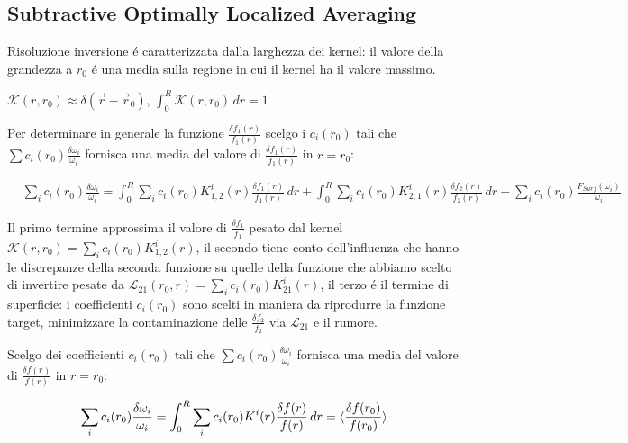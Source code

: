 \documentclass[../main.tex]{subfiles}
\begin{document}
\subsection{Subtractive Optimally Localized Averaging}

\begin{workout}
Risoluzione inversione \'e caratterizzata dalla larghezza dei kernel: il valore della grandezza a $r_0$ \'e una media sulla regione in cui il kernel ha il valore massimo.
\end{workout}

\begin{workout}[OLA]
$\mathcal{K}(r,r_0)\approx\delta(\vec{r}-\vec{r}_0)$, $\int_0^R\mathcal{K}(r,r_0)\,dr=1$
\end{workout}

\begin{workout}

Per determinare in generale la funzione $\frac{\delta f_1(r)}{f_1(r)}$ scelgo i $c_i(r_0)$ tali che $\sum c_i(r_0)\frac{\delta\omega_i}{\omega_i}$ fornisca una media del valore di $\frac{\delta f_1(r)}{f_1(r)}$ in $r=r_0$:

\begin{align*}
&\sum_ic_i(r_0)\frac{\delta\omega_i}{\omega_i}=\int_0^R\sum_ic_i(r_0)K_{1,2}^i(r)\frac{\delta f_1(r)}{f_1(r)}\,dr+\int_0^R\sum_ic_i(r_0)K_{2,1}^i(r)\frac{\delta f_2(r)}{f_2(r)}\,dr+\sum_ic_i(r_0)\frac{F_{Surf}(\omega_i)}{\omega_i}
\end{align*}

Il primo termine approssima il valore di $\frac{\delta f_1}{f_1}$ pesato dal kernel $\mathcal{K}(r,r_0)=\sum_ic_i(r_0)K_{1,2}^i(r)$, il secondo tiene conto dell'influenza che hanno le discrepanze della seconda funzione su quelle della funzione che abbiamo scelto di invertire pesate da $\mathcal{L}_{21}(r_0,r)=\sum_ic_i(r_0)K_{21}^i(r)$, il terzo \'e il termine di superficie: i coefficienti $c_i(r_0)$ sono scelti in maniera da riprodurre la funzione target, minimizzare la contaminazione delle $\frac{\delta f_2}{f_2}$ via $\mathcal{L}_{21}$ e il rumore.

\end{workout}

Scelgo dei coefficienti $c_i(r_0)$ tali che $\sum c_i(r_0)\frac{\delta\omega_i}{\omega_i}$ fornisca una media del valore di $\frac{\delta f(r)}{f(r)}$ in $r=r_0$:

\begin{equation}\label{eq:SOLAfmean}
\sum_ic_i(r_0)\frac{\delta\omega_i}{\omega_i}=\int_0^R\sum_ic_i(r_0)K^i(r)\frac{\delta f(r)}{f(r)}\,dr=\langle \frac{\delta f(r_0)}{f(r_0)} \rangle
\end{equation}
\end{document}
